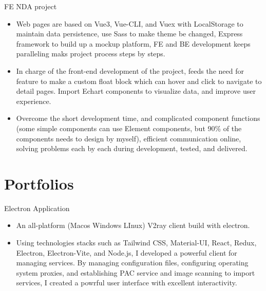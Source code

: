 \documentclass{resume}
\newcommand{\en}[1]{#1}
\newcommand{\zh}[1]{}
\begin{document}
\en{}
\zh{\datedsubsection{\textbf{{中科院自动化所}}}{2022/03 -- 2022/04}}
\en{FE NDA project}
\zh{前端保密项目(外包)}
\begin{itemize}
      \item \en{Web pages are based on Vue3, Vue-CLI, and Vuex with LocalStorage to maintain data persistence, use Sass to make theme be changed, Express framework to build up a mockup platform, FE and BE development keeps paralleling maks project process steps by steps.}
            \zh{页面基于vue3，vue-cli，vuex搭配localstorage实现数据持久化，sass实现风格转换，express搭建mockup前端平台，前后端分离开发，快速迭代。}
      \item \en{In charge of the front-end development of the project, feeds the need for feature to make a custom float block which can hover and click to navigate to detail pages. Import Echart components to visualize data, and improve user experience.}
            \zh{负责前端页面开发，自定义悬浮方块组件并多处复用，满足内容导向功能，引入Echart图表，提高部分页面可视化功能，提高用户体验，解决用户痛点。}
      \item \en{Overcome the short development time, and complicated component functions (some simple components can use Element components, but 90\% of the components needs to design by myself), efficient communication online, solving problems each by each during development, tested, and delivered.}
            \zh{克服开发时间较短（2周），页面功能复杂（部分采用Element组件，页面功能90\%不可使用现有组件库），有效线上沟通，解决页面研发全流程问题，并测试且交付。}
\end{itemize}

\section{\en{Portfolios}\zh{个人项目}}
\en{Electron Application}
\zh{Electron Application}
\begin{itemize}
      \item \en{An all-platform (Macos Windows LInux) V2ray client build with electron.}
            \zh{跨平台的Electron 应用，用于管理并创建V2ray服务，实现网络代理。}
      \item \en{Using technologies stacks such as Tailwind CSS, Material-UI, React, Redux, Electron, Electron-Vite, and Node.js, I developed a powerful client for managing services. By managing configuration files, configuring operating system proxies, and establishing PAC service and image scanning to import services, I created a powrful user interface with excellent interactivity.}
            \zh{使用 Tailwindcss、Material-UI、React、Redux、Electron、Electron-Vite 和 Node.js 等技术，开发了一个功能强大的服务管理工具客户端。我通过管理配置文件、配置操作系统代理、建立 PAC 和图片扫描导入等服务，实现了交互良好的用户界面。}
\end{itemize}
\end{document}

